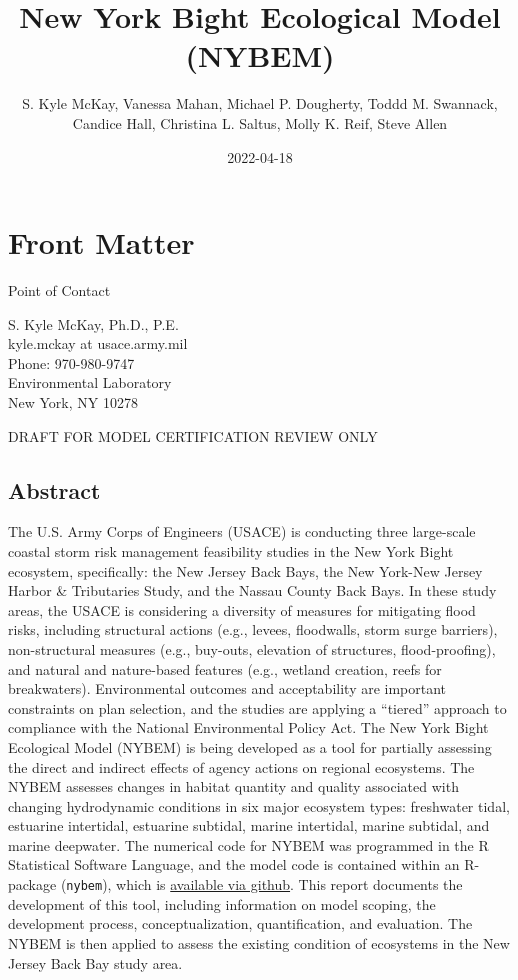 \documentclass[
]{book}
\title{New York Bight Ecological Model (NYBEM)}
\author{S. Kyle McKay, Vanessa Mahan, Michael P. Dougherty, Toddd M. Swannack, Candice Hall, Christina L. Saltus, Molly K. Reif, Steve Allen}
\date{2022-04-18}
\begin{document}
\maketitle

{
\setcounter{tocdepth}{1}
\tableofcontents
}
\hypertarget{front-matter}{%
\chapter*{Front Matter}\label{front-matter}}

Point of Contact

S. Kyle McKay, Ph.D., P.E.\\
kyle.mckay at usace.army.mil\\
Phone: 970-980-9747\\
Environmental Laboratory\\
New York, NY 10278

{DRAFT FOR MODEL CERTIFICATION REVIEW ONLY}

\hypertarget{abstract}{%
\section*{Abstract}\label{abstract}}

The U.S. Army Corps of Engineers (USACE) is conducting three large-scale coastal storm risk management feasibility studies in the New York Bight ecosystem, specifically: the New Jersey Back Bays, the New York-New Jersey Harbor \& Tributaries Study, and the Nassau County Back Bays. In these study areas, the USACE is considering a diversity of measures for mitigating flood risks, including structural actions (e.g., levees, floodwalls, storm surge barriers), non-structural measures (e.g., buy-outs, elevation of structures, flood-proofing), and natural and nature-based features (e.g., wetland creation, reefs for breakwaters). Environmental outcomes and acceptability are important constraints on plan selection, and the studies are applying a ``tiered'' approach to compliance with the National Environmental Policy Act. The New York Bight Ecological Model (NYBEM) is being developed as a tool for partially assessing the direct and indirect effects of agency actions on regional ecosystems. The NYBEM assesses changes in habitat quantity and quality associated with changing hydrodynamic conditions in six major ecosystem types: freshwater tidal, estuarine intertidal, estuarine subtidal, marine intertidal, marine subtidal, and marine deepwater. The numerical code for NYBEM was programmed in the R Statistical Software Language, and the model code is contained within an R-package (\texttt{nybem}), which is \href{https://github.com/MVR-GIS}{available via github}. This report documents the development of this tool, including information on model scoping, the development process, conceptualization, quantification, and evaluation. The NYBEM is then applied to assess the existing condition of ecosystems in the New Jersey Back Bay study area.
\end{document}
